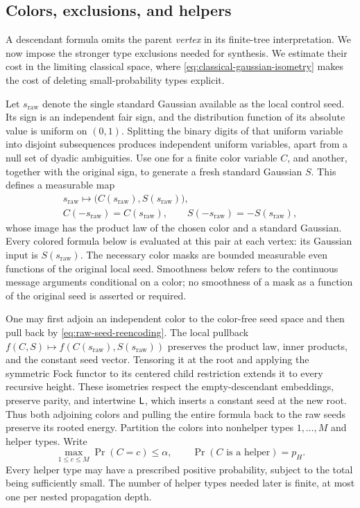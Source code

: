 \subsection{Colors, exclusions, and helpers}

A descendant formula omits the parent \emph{vertex} in its finite-tree
interpretation. We now impose the stronger type exclusions needed
for synthesis. We estimate their cost in the limiting classical space,
where \eqref{eq:classical-gaussian-isometry} makes the cost of deleting
small-probability types explicit.

Let $s_{\mathrm{raw}}$ denote the single standard Gaussian available
as the local control seed. Its sign is an independent fair sign, and
the distribution function of its absolute value is uniform on $(0,1)$.
Splitting the
binary digits of that uniform variable into disjoint subsequences
produces independent uniform variables, apart from a null set of
dyadic ambiguities.  Use one for a finite color variable $C$, and
another, together with the original sign, to generate a fresh
standard Gaussian $S$. This defines a measurable map
\begin{equation}
 \begin{gathered}
 s_{\mathrm{raw}}\longmapsto
       \bigl(C(s_{\mathrm{raw}}),S(s_{\mathrm{raw}})\bigr),\\
 C(-s_{\mathrm{raw}})=C(s_{\mathrm{raw}}),\qquad
 S(-s_{\mathrm{raw}})=-S(s_{\mathrm{raw}}),
 \end{gathered}
 \label{eq:raw-seed-reencoding}
\end{equation}
whose image has the product law of the chosen color and a standard
Gaussian. Every colored formula below is evaluated at this pair at
each vertex: its Gaussian input is $S(s_{\mathrm{raw}})$.
The necessary color masks are bounded measurable even functions of
the original local seed.  Smoothness below refers to the continuous
message arguments conditional on a color; no smoothness of a mask
as a function of the original seed is asserted or required.

One may first adjoin an independent color to the color-free seed
space and then pull back by \eqref{eq:raw-seed-reencoding}.
The local pullback $f(C,S)\mapsto
f(C(s_{\mathrm{raw}}),S(s_{\mathrm{raw}}))$ preserves the product
law, inner products, and the constant seed vector. Tensoring it at
the root and applying the symmetric Fock functor to its centered
child restriction extends it to every recursive height. These
isometries respect the empty-descendant embeddings, preserve parity,
and intertwine $\mathsf L$, which inserts a constant seed at the new root.
Thus both adjoining colors and pulling the entire formula back to
the raw seeds preserve its rooted energy. Partition the colors
into nonhelper types $1,\ldots,M$ and helper types.  Write
\[
 \max_{1\le c\le M}\Pr(C=c)\le\alpha,
 \qquad \Pr(C\text{ is a helper})=p_H.
\]
Every helper type may have a prescribed positive probability, subject
to the total being sufficiently small.  The number of helper types
needed later is finite, at most one per nested propagation depth.

